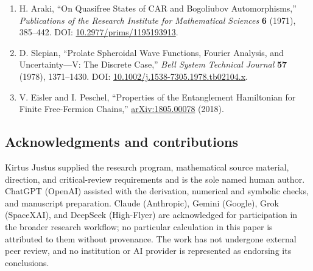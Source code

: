 \documentclass[
  10pt,
  a4paper,
]{article}
\providecommand{\tightlist}{%
  \setlength{\itemsep}{0pt}\setlength{\parskip}{0pt}}
\begin{document}
\begin{enumerate}
\def\labelenumi{\arabic{enumi}.}
\tightlist
\item
  H. Araki, ``On Quasifree States of CAR and Bogoliubov Automorphisms,'' \emph{Publications of the Research Institute for Mathematical Sciences} \textbf{6} (1971), 385--442. DOI: \href{https://doi.org/10.2977/prims/1195193913}{10.2977/prims/1195193913}.
\item
  D. Slepian, ``Prolate Spheroidal Wave Functions, Fourier Analysis, and Uncertainty---V: The Discrete Case,'' \emph{Bell System Technical Journal} \textbf{57} (1978), 1371--1430. DOI: \href{https://doi.org/10.1002/j.1538-7305.1978.tb02104.x}{10.1002/j.1538-7305.1978.tb02104.x}.
\item
  V. Eisler and I. Peschel, ``Properties of the Entanglement Hamiltonian for Finite Free-Fermion Chains,'' \href{https://arxiv.org/abs/1805.00078}{arXiv:1805.00078} (2018).
\end{enumerate}

\subsection{Acknowledgments and contributions}\label{acknowledgments-and-contributions}

Kirtus Justus supplied the research program, mathematical source material, direction, and critical-review requirements and is the sole named human author. ChatGPT (OpenAI) assisted with the derivation, numerical and symbolic checks, and manuscript preparation. Claude (Anthropic), Gemini (Google), Grok (SpaceXAI), and DeepSeek (High-Flyer) are acknowledged for participation in the broader research workflow; no particular calculation in this paper is attributed to them without provenance. The work has not undergone external peer review, and no institution or AI provider is represented as endorsing its conclusions.
\end{document}
